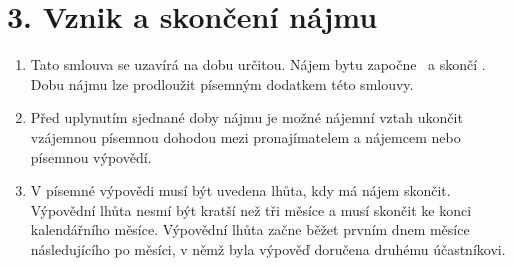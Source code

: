 \section*{3. Vznik a skončení nájmu}

\begin{enumerate}[label=\arabic*.]
    \item Tato smlouva se uzavírá na dobu určitou. Nájem bytu započne \Rentstartdate \ a skončí \Rentenddate. Dobu nájmu lze prodloužit písemným dodatkem této smlouvy.
    \item Před uplynutím sjednané doby nájmu je možné nájemní vztah ukončit vzájemnou písemnou dohodou mezi pronajímatelem a nájemcem nebo písemnou výpovědí.
    \item V písemné výpovědi musí být uvedena lhůta, kdy má nájem skončit. Výpovědní lhůta nesmí být kratší než tři měsíce a musí skončit ke konci kalendářního měsíce. Výpovědní lhůta začne běžet prvním dnem měsíce následujícího po měsíci, v němž byla výpověď doručena druhému účastníkovi.
\end{enumerate}
